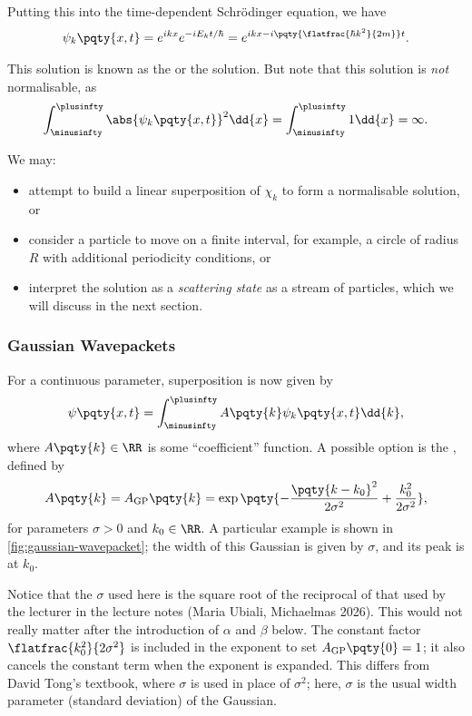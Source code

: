 Putting this into the time-dependent Schr\"{o}dinger equation, we have
\begin{equation}
    \psi_k\pqty{x, t} = e^{i k x} e^{- i E_k t / \hbar} = e^{i k x - i \pqty{\flatfrac{\hbar k^2}{2 m}} t}.
\end{equation}

This solution is known as the  or the  solution. But note that this solution is \emph{not} normalisable, as
\begin{equation}
    \int_{\minusinfty}^{\plusinfty} \abs{\psi_k\pqty{x, t}}^2 \dd{x} = \int_{\minusinfty}^{\plusinfty} 1 \dd{x} = \infty.
\end{equation}

We may:
\begin{itemize}
    \item attempt to build a linear superposition of \(\chi_k\) to form a normalisable solution, or
    \item consider a particle to move on a finite interval, for example, a circle of radius \(R\) with additional periodicity conditions, or
    \item interpret the solution as a \emph{scattering state} as a stream of particles, which we will discuss in the next section.
\end{itemize}

\subsubsection{Gaussian Wavepackets}

For a continuous parameter, superposition is now given by
\begin{equation}
    \psi\pqty{x, t} = \int_{\minusinfty}^{\plusinfty} A\pqty{k} \psi_k \pqty{x, t} \dd{k},
\end{equation}
where \(A\pqty{k} \in \RR\) is some ``coefficient'' function. A possible option is the , defined by
\begin{equation}
    A\pqty{k} = A_{\text{GP}} \pqty{k} = \exp\pqty{- \frac{\pqty{k - k_0}^2}{2 \sigma^2} + \frac{k_0^2}{2 \sigma^2}},
\end{equation}
for parameters \(\sigma > 0\) and \(k_0 \in \RR\). A particular example is shown in \autoref{fig:gaussian-wavepacket}; the width of this Gaussian is given by \(\sigma\), and its peak is at \(k_0\).

\begin{remark}
    Notice that the \(\sigma\) used here is the square root of the reciprocal of that used by the lecturer in the lecture notes (Maria Ubiali, Michaelmas 2026). This would not really matter after the introduction of \(\alpha\) and \(\beta\) below. The constant factor \(\flatfrac{k_0^2}{2 \sigma^2}\) is included in the exponent to set \(A_{\text{GP}}\pqty{0} = 1\); it also cancels the constant term when the exponent is expanded. This differs from David Tong's textbook, where \(\sigma\) is used in place of \(\sigma^2\); here, \(\sigma\) is the usual width parameter (standard deviation) of the Gaussian.
\end{remark}

